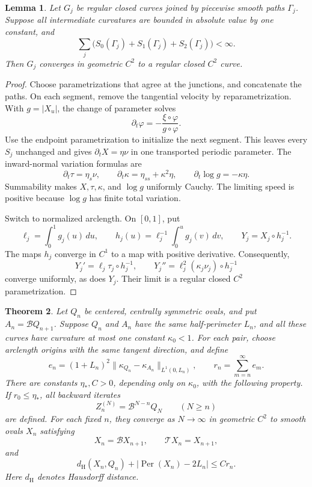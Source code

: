\documentclass[11pt]{article}
\numberwithin{equation}{section}
\newtheorem{theorem}{Theorem}[section]
\newtheorem{lemma}[theorem]{Lemma}
\newcommand{\Tmap}{\mathcal T}
\newcommand{\Bmap}{\mathcal B}
\newcommand{\abs}[1]{\lvert #1\rvert}
\newcommand{\norm}[1]{\lVert #1\rVert}
\DeclareMathOperator{\Per}{Per}
\begin{document}
\begin{lemma}\label{lem:complete}
Let \(G_j\) be regular closed curves joined by piecewise smooth paths
\(\Gamma_j\). Suppose all intermediate curvatures are bounded in absolute
value by one constant, and
\[
  \sum_j\bigl(S_0(\Gamma_j)+S_1(\Gamma_j)+S_2(\Gamma_j)\bigr)<\infty.
\]
Then \(G_j\) converges in geometric \(C^2\) to a regular closed \(C^2\)
curve.
\end{lemma}

\begin{proof}
Choose parametrizations that agree at the junctions, and concatenate the
paths. On each segment, remove the tangential velocity by reparametrization.
With \(g=\abs{X_u}\), the change of parameter solves
\[
  \partial_t\varphi=-\frac{\xi\circ\varphi}{g\circ\varphi}.
\]
Use the endpoint parametrization to initialize the next segment. This leaves
every \(S_j\) unchanged and gives \(\partial_tX=\eta\nu\) in one
transported periodic parameter. The inward-normal variation formulas are
\begin{equation}\label{eq:normal-flow}
  \partial_t\tau=\eta_s\nu,\qquad
  \partial_t\kappa=\eta_{ss}+\kappa^2\eta,\qquad
  \partial_t\log g=-\kappa\eta.
\end{equation}
Summability makes \(X,\tau,\kappa\), and \(\log g\) uniformly Cauchy.
The limiting speed is positive because \(\log g\) has finite total
variation.

Switch to normalized arclength. On \([0,1]\), put
\[
  \ell_j=\int_0^1 g_j(u)\,du,\qquad
  h_j(u)=\ell_j^{-1}\int_0^u g_j(v)\,dv,\qquad
  Y_j=X_j\circ h_j^{-1}.
\]
The maps \(h_j\) converge in \(C^1\) to a map with positive derivative.
Consequently,
\[
  Y_j'=\ell_j\tau_j\circ h_j^{-1},\qquad
  Y_j''=\ell_j^2(\kappa_j\nu_j)\circ h_j^{-1}
\]
converge uniformly, as does \(Y_j\). Their limit is a regular closed
\(C^2\) parametrization.
\end{proof}

\begin{theorem}\label{thm:shadow}
Let \(Q_n\) be centered, centrally symmetric ovals, and put
\(A_n=\Bmap Q_{n+1}\). Suppose \(Q_n\) and \(A_n\) have the same
half-perimeter \(L_n\), and all these curves have curvature at most one
constant \(\kappa_0<1\). For each pair, choose arclength origins with the
same tangent direction, and define
\[
  e_n=(1+L_n)^2\norm{\kappa_{Q_n}-\kappa_{A_n}}_{L^1(0,L_n)},\qquad
  r_n=\sum_{m=n}^{\infty}e_m.
\]
There are constants \(\eta_*,C>0\), depending only on \(\kappa_0\), with
the following property. If \(r_0\leq\eta_*\), all backward iterates
\[
  Z_n^{(N)}=\Bmap^{N-n}Q_N\qquad(N\geq n)
\]
are defined. For each fixed \(n\), they converge as \(N\to\infty\) in
geometric \(C^2\) to smooth ovals \(X_n\) satisfying
\[
  X_n=\Bmap X_{n+1},\qquad \Tmap X_n=X_{n+1},
\]
and
\begin{equation}\label{eq:shadow-distance}
  d_{\mathrm H}(X_n,Q_n)+\abs{\Per(X_n)-2L_n}\leq Cr_n.
\end{equation}
Here \(d_{\mathrm H}\) denotes Hausdorff distance.
\end{theorem}
\end{document}
